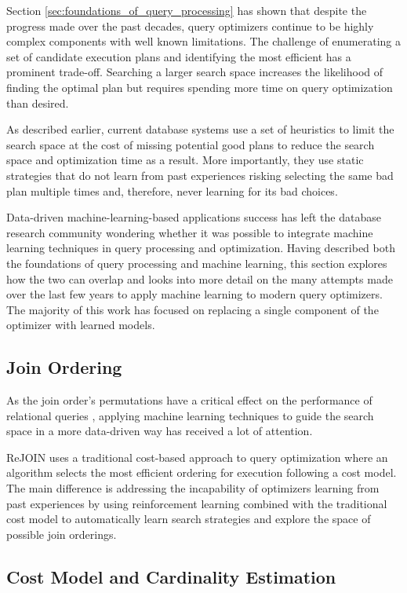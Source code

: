 Section \ref{sec:foundations_of_query_processing} has shown that despite the progress made over the past decades, query optimizers continue to be highly complex components with well known limitations. The challenge of enumerating a set of candidate execution plans and identifying the most efficient has a prominent trade-off. Searching a larger search space increases the likelihood of finding the optimal plan but requires spending more time on query optimization than desired.

As described earlier, current database systems use a set of heuristics to limit the search space at the cost of missing potential good plans to reduce the search space and optimization time as a result. More importantly, they use static strategies that do not learn from past experiences risking selecting the same bad plan multiple times and, therefore, never learning for its bad choices.

Data-driven machine-learning-based applications success has left the database research community wondering whether it was possible to integrate machine learning techniques in query processing and optimization. Having described both the foundations of query processing and machine learning, this section explores how the two can overlap and looks into more detail on the many attempts made over the last few years to apply machine learning to modern query optimizers. The majority of this work has focused on replacing a single component of the optimizer with learned models.

\subsection{Join Ordering}

As the join order's permutations have a critical effect on the performance of relational queries \citep{Ozsu2011}, applying machine learning techniques to guide the search space in a more data-driven way has received a lot of attention.

ReJOIN \citep{Marcus2018a} uses a traditional cost-based approach to query optimization where an algorithm selects the most efficient ordering for execution following a cost model. The main difference is addressing the incapability of optimizers learning from past experiences by using reinforcement learning combined with the traditional cost model to automatically learn search strategies and explore the space of possible join orderings.

\subsection{Cost Model and Cardinality Estimation}


